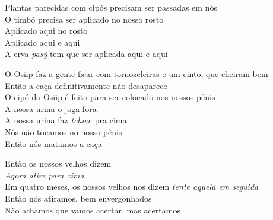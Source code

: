  \smallskip
 \begin{center}\end{center}
 \smallskip
 
\noindent  Plantas parecidas com cipós precisam ser passadas em nós\\
 O timbó precisa ser aplicado no nosso rosto\\
 Aplicado aqui no rosto\\
 Aplicado aqui e aqui\\
 A erva \textit{pasỹ} tem que ser aplicada aqui e aqui
 
 \smallskip
 \begin{center}\end{center}
 \smallskip
 
\noindent  O Osiip faz a gente ficar com tornozeleiras e um cinto, que cheiram bem\\
 Então a caça definitivamente não desaparece\\
 O cipó do Osiip é feito para ser colocado nos nossos pênis\\
 A nossa urina o joga fora\\
 A nossa urina faz \textit{tchoo}, pra cima\\
 Nós não tocamos no nosso pênis\\
 Então nós matamos a caça
 
 \smallskip
 \begin{center}\end{center}
 \smallskip
 
\noindent  Então os nossos velhos dizem\\
 \textit{Agora atire para cima}\\
 Em quatro meses, os nossos velhos nos dizem \textit{tente aquela em seguida}\\
 Então nós atiramos, bem envergonhados\\
 Não achamos que vamos acertar, mas acertamos
 
